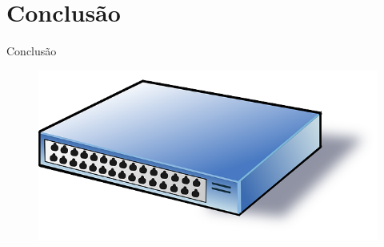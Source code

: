 \section{Conclusão}

\begin{frame}{Conclusão}

    \begin{figure}[h]
        \centering
        \includegraphics[width=\linewidth]{images/conclusion}
    \end{figure}
\end{frame}
